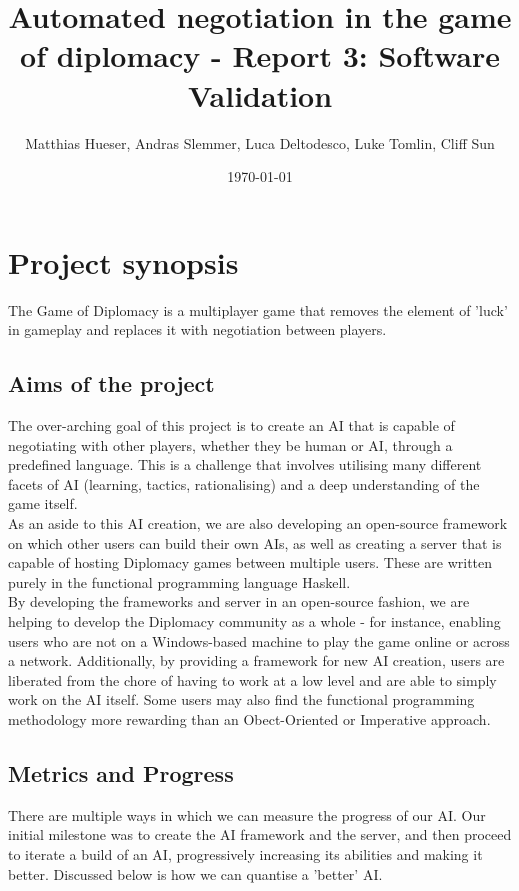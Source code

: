 \documentclass[12pt]{article}
\title{Automated negotiation in the game of diplomacy - Report 3: Software Validation}
\author{Matthias Hueser, Andras Slemmer, Luca Deltodesco, Luke Tomlin, Cliff Sun}
\date{\today}
\begin{document}
\maketitle

\section{Project synopsis}
The Game of Diplomacy is a multiplayer game that removes the element of 'luck' in gameplay and replaces it with negotiation between players. 
\subsection{Aims of the project}
The over-arching goal of this project is to create an AI that is capable of negotiating with other players, whether they be human or AI, through a predefined language. This is a challenge that involves utilising many different facets of AI (learning, tactics, rationalising) and a deep understanding of the game itself.
\\
As an aside to this AI creation, we are also developing an open-source framework on which other users can build their own AIs, as well as creating a server that is capable of hosting Diplomacy games between multiple users. These are written purely in the functional programming language Haskell.
\\
By developing the frameworks and server in an open-source fashion, we are helping to develop the Diplomacy community as a whole - for instance, enabling users who are not on a Windows-based machine to play the game online or across a network. Additionally, by providing a framework for new AI creation, users are liberated from the chore of having to work at a low level and are able to simply work on the AI itself. Some users may also find the functional programming methodology more rewarding than an Obect-Oriented or Imperative approach.
\subsection{Metrics and Progress}
There are multiple ways in which we can measure the progress of our AI. Our initial milestone was to create the AI framework and the server, and then proceed to iterate a build of an AI, progressively increasing its abilities and making it better. Discussed below is how we can quantise a 'better' AI.
\end{document}
